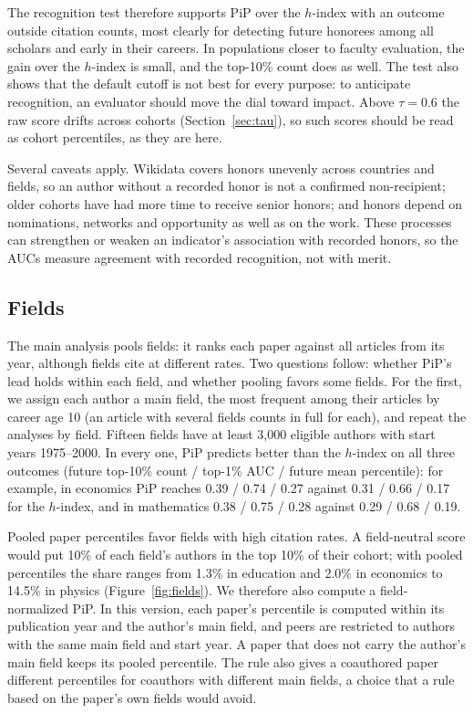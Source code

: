 \documentclass[11pt]{article}
\begin{document}
The recognition test therefore supports PiP over the $h$-index with an outcome outside citation counts, most clearly for
detecting future honorees among all scholars and early in their careers. In populations closer to faculty evaluation,
the gain over the $h$-index is small, and the top-10\% count does as well. The test also shows that the default cutoff
is not best for every purpose: to anticipate recognition, an evaluator should move the dial toward impact. Above $\tau
= 0.6$ the raw score drifts across cohorts (Section~\ref{sec:tau}), so such scores should be read as cohort percentiles,
as they are here.

Several caveats apply. Wikidata covers honors unevenly across countries and fields, so an author without a recorded
honor is not a confirmed non-recipient; older cohorts have had more time to receive senior honors; and honors depend
on nominations, networks and opportunity as well as on the work. These processes can strengthen or weaken an
indicator's association with recorded honors, so the AUCs measure agreement with recorded recognition, not with merit.

\subsection{Fields}
\label{sec:fields}

The main analysis pools fields: it ranks each paper against all articles from its year, although fields cite at
different rates. Two questions follow: whether PiP's lead holds within each field, and whether pooling favors some
fields. For the first, we assign each author a main field, the most frequent among their articles by career age 10
(an article with several fields counts in full for each), and repeat the analyses by field. Fifteen fields have at
least 3,000 eligible authors with start years 1975--2000. In every one, PiP predicts better than the $h$-index on all
three outcomes (future top-10\% count / top-1\% AUC / future mean percentile): for example, in economics PiP reaches
0.39 / 0.74 / 0.27 against 0.31 / 0.66 / 0.17 for the $h$-index, and in mathematics 0.38 / 0.75 / 0.28 against
0.29 / 0.68 / 0.19.

Pooled paper percentiles favor fields with high citation rates. A field-neutral score would put 10\% of each field's
authors in the top 10\% of their cohort; with pooled percentiles the share ranges from 1.3\% in education and 2.0\% in
economics to 14.5\% in physics (Figure~\ref{fig:fields}). We therefore also compute a field-normalized PiP. In this
version, each paper's percentile is computed within its publication year and the author's main field, and peers are
restricted to authors with the same main field and start year. A paper that does not carry the author's main field keeps
its pooled percentile. The rule also gives a coauthored paper different percentiles for coauthors with different main
fields, a choice that a rule based on the paper's own fields would avoid.
\end{document}

